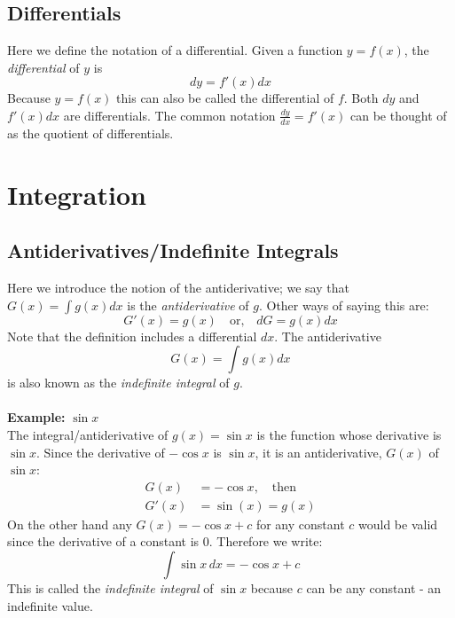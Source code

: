 \documentclass{report}
\begin{document}
\subsection{Differentials} %
Here we define the notation of a differential. Given a function 
$y=f(x)$, the \textit{differential} of $y$ is
\begin{equation*}
dy=f'(x)dx
\end{equation*}
Because $y=f(x)$ this can also be called the differential of $f$. 
Both $dy$ and $f'(x)dx$ are differentials. The common notation $\frac{dy}{dx}=f'(x)$ can
be thought of as the quotient of differentials.
\newpage


\section{Integration}
\subsection{Antiderivatives/Indefinite Integrals} %
Here we introduce the notion of the antiderivative; we say 
that $G(x)=\int g(x)dx$ is the \textit{antiderivative} of $g$. Other ways of saying this are:
\begin{equation*}
G'(x)=g(x)\quad\text{or,}\quad dG=g(x)dx
\end{equation*}
Note that the definition includes a differential $dx$.
The antiderivative
\begin{equation*}
G(x)=\int g(x)dx
\end{equation*}
is also known as the \textit{indefinite integral} of $g$.\\
\vspace{1mm}\\
\textbf{Example:} $\sin x$\\
The integral/antiderivative of $g(x)=\sin x$ is the function whose derivative
is $\sin x$. Since the derivative of $-\cos x$ is $\sin x$, it is an antiderivative, $G(x)$ of $\sin x$:
\begin{align*}
G(x)&=-\cos x,\quad\text{then}\\
G'(x)&=\sin(x)=g(x)
\end{align*}
On the other hand any $G(x)=-\cos x+c$ for any constant $c$ would be valid
since the derivative of a constant is 0. Therefore we write:
\begin{equation*}
\int\sin x\,dx=-\cos x+c
\end{equation*}
This is called the \textit{indefinite integral} of $\sin x$ because $c$ can be any
constant - an indefinite value.
\newpage
\end{document}
